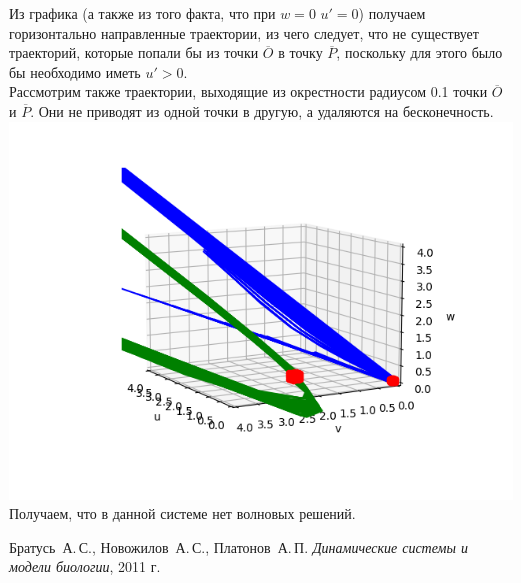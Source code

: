 \documentclass[oneside, final, 12pt]{article}
\begin{document}
Из графика (а также из того факта, что при \(w=0\)  \(u' = 0\)) получаем горизонтально направленные траектории, из чего следует, что не существует траекторий, которые попали бы из точки \(\overline{O}\) в точку \(\overline{P}\), поскольку для этого было бы необходимо иметь \(u' > 0\).\\

Рассмотрим также траектории, выходящие из окрестности радиусом 0.1 точки \(\overline{O}\) и \(\overline{P}\). Они не приводят из одной точки в другую, а удаляются на бесконечность.\\

\includegraphics[width=1\textwidth]{Figure_14.png}\\

Получаем, что в данной системе нет волновых решений.


\newpage
\clearpage
\begin{thebibliography}{0}
	Братусь~А.\,С., Новожилов~А.\,С., Платонов~А.\,П. \label{Bratus_book}
	\emph{Динамические системы и модели биологии},
	2011 г.
\end{thebibliography}
\end{document}
